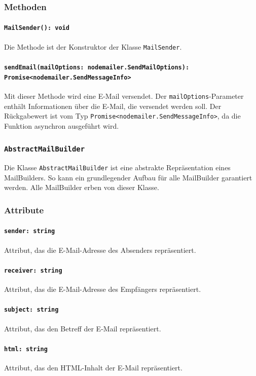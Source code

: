 \documentclass{entwurfsheft}
\begin{document}
\begin{sloppypar}
\subsubsection*{Methoden}
\paragraph{\texttt{MailSender(): void}}
Die Methode ist der Konstruktor der Klasse \texttt{MailSender}.
\paragraph{\texttt{sendEmail(mailOptions: nodemailer.SendMailOptions): \\Promise<nodemailer.SendMessageInfo>}}
Mit dieser Methode wird eine E-Mail versendet. Der \texttt{mailOptions}-Parameter enthält Informationen über die E-Mail, die versendet werden soll. Der Rückgabewert ist vom Typ \texttt{Promise<nodemailer.SendMessageInfo>}, da die Funktion asynchron ausgeführt wird.

\subsubsection{\texttt{AbstractMailBuilder}}\label{sec:AbstractMailBuilder}
Die Klasse \texttt{AbstractMailBuilder} ist eine abstrakte Repräsentation eines MailBuilders. So kann ein grundlegender Aufbau für alle MailBuilder garantiert werden. Alle MailBuilder erben von dieser Klasse.
\subsubsection*{Attribute}
\paragraph{\texttt{sender: string}}
Attribut, das die E-Mail-Adresse des Absenders repräsentiert.
\paragraph{\texttt{receiver: string}}
Attribut, das die E-Mail-Adresse des Empfängers repräsentiert.
\paragraph{\texttt{subject: string}}
Attribut, das den Betreff der E-Mail repräsentiert.
\paragraph{\texttt{html: string}}
Attribut, das den HTML-Inhalt der E-Mail repräsentiert.


\end{sloppypar}
\end{document}
